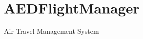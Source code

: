 \chapter{AEDFlight\+Manager}
\hypertarget{index}{}\label{index}
\label{index_md__2_users_2antonioabilio_2_c_lion_projects_2_a_e_d_flight_manager_2_r_e_a_d_m_e}%
%
Air Travel  Management System 